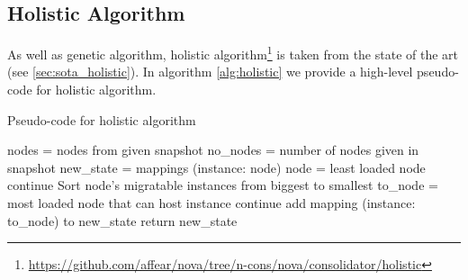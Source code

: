 \subsection{Holistic Algorithm}
\label{sub:algs_holistic}
As well as genetic algorithm, holistic algorithm\footnote{\url{https://github.com/affear/nova/tree/n-cons/nova/consolidator/holistic}} is taken from the state of the art (see \ref{sec:sota_holistic}). In algorithm \ref{alg:holistic} we provide a high-level pseudo-code for holistic algorithm.

\begin{algorithm}[H]
\caption{Pseudo-code for holistic algorithm}
\label{alg:holistic}
\begin{algorithmic}[0]
	\State nodes = nodes from given snapshot
	\State no\_nodes = number of nodes given in snapshot
	\State new\_state = mappings (instance: node)
	\State
		\State node = least loaded node
		\State
			\State continue
		\EndIf
		\State
		\State Sort node's migratable instances from biggest to smallest
		\State
			\State to\_node = most loaded node that can host instance
				\State continue
			\EndIf
			\State add mapping (instance: to\_node) to new\_state
		\EndFor
	\EndFor
	\State
	\State return new\_state
\end{algorithmic}
\end{algorithm}
